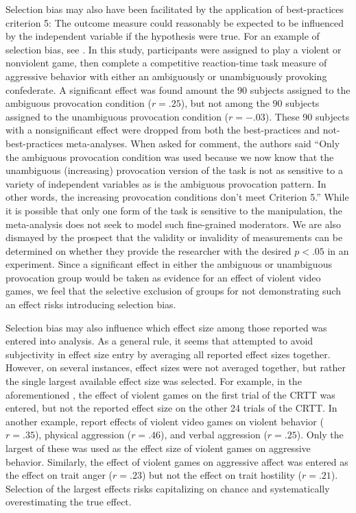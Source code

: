 \documentclass[man]{apa6}
\begin{document}
Selection bias may also have been facilitated by the application of best-practices criterion 5: The outcome measure could reasonably be expected to be influenced by the independent variable if the hypothesis were true. For an example of selection bias, see \citet[study 2]{Anderson:etal:2004}. In this study, participants were assigned to play a violent or nonviolent game, then complete a competitive reaction-time task measure of aggressive behavior with either an ambiguously or unambiguously provoking confederate. A significant effect was found amount the 90  subjects assigned to the ambiguous provocation condition ($r = .25$), but not among the 90 subjects assigned to the unambiguous provocation condition ($r = -.03$). These 90 subjects with a nonsignificant effect were dropped from both the best-practices and not-best-practices meta-analyses. When asked for comment, the authors said ``Only the ambiguous provocation condition was used because we now know that the unambiguous (increasing) provocation version of the task is not as sensitive to a variety of independent variables as is the ambiguous provocation pattern. In other words, the increasing provocation conditions don't meet Criterion 5.'' While it is possible that only one form of the task is sensitive to the manipulation, the meta-analysis does not seek to model such fine-grained moderators. We are also dismayed by the prospect that the validity or invalidity of measurements can be determined on whether they provide the researcher with the desired $p<.05$ in an experiment. Since a significant effect in either the ambiguous or unambiguous provocation group would be taken as evidence for an effect of violent video games, we feel that the selective exclusion of groups for not demonstrating such an effect risks introducing selection bias.

Selection bias may also influence which effect size among those reported was entered into analysis. As a general rule, it seems that \citet{Anderson:etal:2010} attempted to avoid subjectivity in effect size entry by averaging all reported effect sizes together. However, on several instances, effect sizes were not averaged together, but rather the single largest available effect size was selected. For example, in the aforementioned \citet[study 2]{Anderson:etal:2004}, the effect of violent games on the first trial of the CRTT was entered, but not the reported effect size on the other 24 trials of the CRTT. In another example, \citet[study 2]{Anderson:etal:2007} report effects of violent video games on violent behavior ($r = .35$), physical aggression ($r = .46$), and verbal aggression ($r = .25$). Only the largest of these was used as the effect size of violent games on aggressive behavior. Similarly, the effect of violent games on aggressive affect was entered as the effect on trait anger ($r = .23$) but not the effect on trait hostility ($r = .21$). Selection of the largest effects risks capitalizing on chance and systematically overestimating the true effect.
\end{document}
